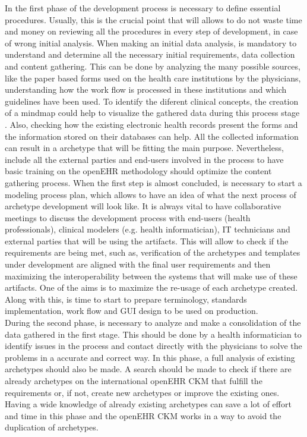 \documentclass[mim_thesis.tex]{subfiles}
\begin{document}
In the first phase of the development process is necessary to define essential procedures. Usually, this is the crucial point that will allows to do not waste time and money on reviewing all the procedures in every step of development, in case of wrong initial analysis. When making an initial data analysis, is mandatory to understand and determine all the necessary initial requirements, data collection and content gathering. This can be done by analyzing the many possible sources, like the paper based forms used on the health care institutions by the physicians, understanding how the work flow is processed in these institutions and which guidelines have been used. To identify the diferent clinical concepts, the creation of a mindmap could help to visualize the gathered data during this process stage \citep{marcos2010towards}. Also, checking how the existing electronic health records present the forms and the information stored on their databases can help. All the collected information can result in a archetype that will be fitting the main purpose. Nevertheless, include all the external parties and end-users involved in the process to have basic training on the openEHR methodology should optimize the content gathering process. When the first step is almost concluded, is necessary to start a modeling process plan, which allows to have an idea of what the next process of archetype development will look like. It is always vital to have collaborative meetings to discuss the development process with end-users (health professionals), clinical modelers (e.g. health informatician), IT technicians and external parties that will be using the artifacts. This will allow to check if the requirements are being met, such as, verification of the archetypes and templates under development are aligned with the final user requirements and then maximizing the interoperability between the systems that will make use of these artifacts. One of the aims is to maximize the re-usage of each archetype created. Along with this, is time to start to prepare terminology, standards implementation, work flow and \ac{GUI} design to be used on production. \\

During the second phase, is necessary to analyze and make a consolidation of the data gathered in the first stage. This should be done by a health informatician to identify issues in the process and contact directly with the physicians to solve the problems in a accurate and correct way. In this phase, a full analysis of existing archetypes should also be made. A search should be made to check if there are already archetypes on the international openEHR CKM that fulfill the requirements or, if not, create new archetypes or improve the existing ones. Having a wide knowledge of already existing archetypes can save a lot of effort and time in this phase and the openEHR CKM works in a way to avoid the duplication of archetypes. \\
\end{document}
